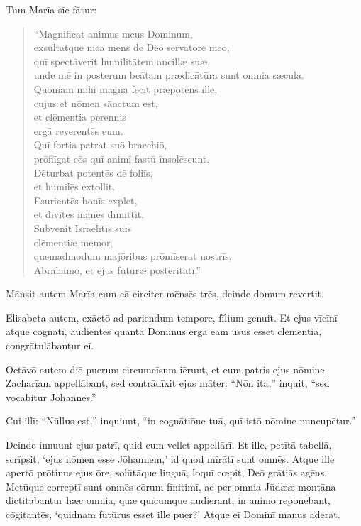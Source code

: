 \Versus Tum Marīa sīc fātur:
\begin{verse}
\begin{patverse*}
``Magnificat animus meus Dominum,\\
\Versus exsultatque mea mēns dē Deō servātōre meō,\\
\Versus quī spectāverit humilitātem ancillæ suæ,\\
unde mē in posterum beātam prædicātūra sunt omnia sæcula.\\
\Versus Quoniam mihi magna fēcit præpotēns ille,\\
cujus et nōmen sānctum est,\\
\Versus et clēmentia perennis\\
ergā reverentēs eum.\\
\Versus Quī fortia patrat suō bracchiō,\\
prōflīgat eōs quī animī fastū īnsolēscunt.\\
\Versus Dēturbat potentēs dē foliīs,\\
et humilēs extollit.\\
\Versus Ēsurientēs bonīs explet,\\
et dīvitēs inānēs dīmittit.\\
\Versus Subvenit Isrāēlītīs suīs \\
clēmentiæ memor,\\
\Versus quemadmodum majōribus prōmīserat nostrīs,\\
Abrahāmō, et ejus futūræ posteritātī.''
\end{patverse*}
\end{verse}

\Versus Mānsit autem Marīa cum eā circiter mēnsēs trēs, deinde domum revertit.

\Versus Elisabeta autem, exāctō ad pariendum tempore, fīlium genuit.
\Versus Et ejus vīcīnī atque cognātī, audientēs quantā Dominus ergā eam ūsus esset clēmentiā, congrātulābantur eī.

\Versus Octāvō autem diē puerum circumcīsum iērunt, et eum patris ejus nōmine Zacha\-rīam appellābant,
\Versus sed contrādīxit ejus māter: ``Nōn ita,'' inquit, ``sed vocābitur Jōhan\-nēs.''

\Versus Cui illī: ``Nūllus est,'' inquiunt, ``in cognātiōne tuā, quī istō nōmine nuncupētur.''

\Versus Deinde innuunt ejus patrī, quid eum vellet appellārī.
\Versus Et ille, petītā tabellā, scrīpsit, `ejus nōmen esse Jōhannem,' id quod mīrātī sunt omnēs.
\Versus Atque ille apertō prōtinus ejus ōre, solūtāque linguā, loquī cœpit, Deō grātiās agēns.
\Versus Metūque correptī sunt omnēs eōrum fīnitimī, ac per omnia Jūdææ montāna dictitābantur hæc omnia,
\Versus quæ quīcumque audierant, in animō repōnēbant, cōgitantēs, `quidnam futūrus esset ille puer?' Atque eī Dominī manus aderat.

